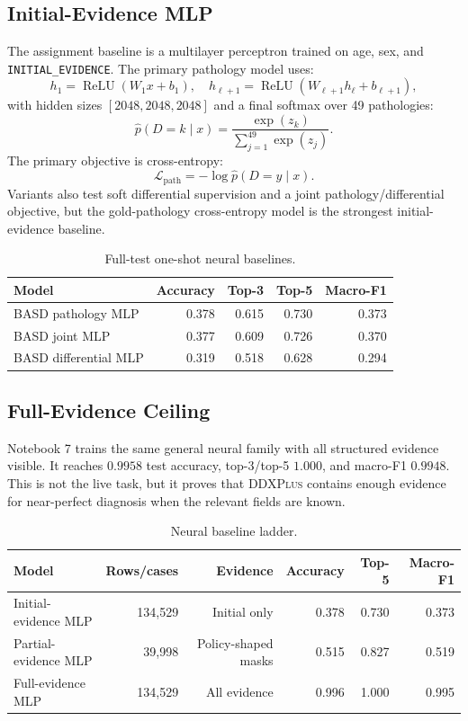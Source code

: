 \documentclass[11pt]{article}
\newcommand{\ddx}{\textsc{DDXPlus}}
\begin{document}
\subsection{Initial-Evidence MLP}

The assignment baseline is a multilayer perceptron trained on age, sex, and \texttt{INITIAL\_EVIDENCE}. The primary pathology model uses:
\[
h_1=\operatorname{ReLU}(W_1x+b_1), \quad
h_{\ell+1}=\operatorname{ReLU}(W_{\ell+1}h_\ell+b_{\ell+1}),
\]
with hidden sizes $[2048,2048,2048]$ and a final softmax over 49 pathologies:
\[
\hat{p}(D=k\mid x)=\frac{\exp(z_k)}{\sum_{j=1}^{49}\exp(z_j)}.
\]
The primary objective is cross-entropy:
\[
\mathcal{L}_{\text{path}} = -\log \hat{p}(D=y \mid x).
\]
Variants also test soft differential supervision and a joint pathology/differential objective, but the gold-pathology cross-entropy model is the strongest initial-evidence baseline.

\begin{table}[H]
\centering
\caption{Full-test one-shot neural baselines.}
\begin{tabular}{lrrrr}
\toprule
Model & Accuracy & Top-3 & Top-5 & Macro-F1 \\
\midrule
BASD pathology MLP & 0.378 & 0.615 & 0.730 & 0.373 \\
BASD joint MLP & 0.377 & 0.609 & 0.726 & 0.370 \\
BASD differential MLP & 0.319 & 0.518 & 0.628 & 0.294 \\
\bottomrule
\end{tabular}
\end{table}

\subsection{Full-Evidence Ceiling}

Notebook 7 trains the same general neural family with all structured evidence visible. It reaches $0.9958$ test accuracy, top-3/top-5 $1.000$, and macro-F1 $0.9948$. This is not the live task, but it proves that \ddx{} contains enough evidence for near-perfect diagnosis when the relevant fields are known.

\begin{table}[H]
\centering
\caption{Neural baseline ladder.}
\begin{tabular}{lrrrrr}
\toprule
Model & Rows/cases & Evidence & Accuracy & Top-5 & Macro-F1 \\
\midrule
Initial-evidence MLP & 134,529 & Initial only & 0.378 & 0.730 & 0.373 \\
Partial-evidence MLP & 39,998 & Policy-shaped masks & 0.515 & 0.827 & 0.519 \\
Full-evidence MLP & 134,529 & All evidence & 0.996 & 1.000 & 0.995 \\
\bottomrule
\end{tabular}
\end{table}
\end{document}
